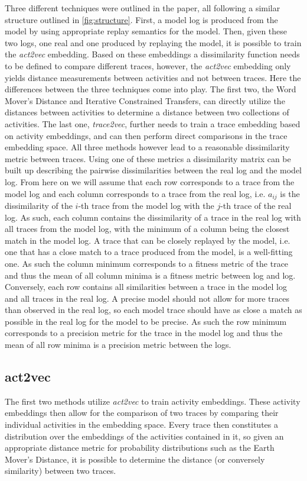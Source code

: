 \documentclass[runningheads]{template/llncs}
\begin{document}
\color{blue}
Three different techniques were outlined in the paper, all following a similar structure outlined in \cref{fig:structure}.
First, a model log is produced from the model by using appropriate replay semantics for the model.
Then, given these two logs, one real and one produced by replaying the model, it is possible to train the \emph{act2vec} \cite{KBWe18} embedding.
Based on these embeddings a dissimilarity function needs to be defined to compare different traces, however, the \emph{act2vec} embedding only yields distance measurements between activities and not between traces.
Here the differences between the three techniques come into play.
The first two, the Word Mover's Distance \cite{KSKW15} and Iterative Constrained Transfers, can directly utilize the distances between activities to determine a distance between two collections of activities.
The last one, \emph{trace2vec}, further needs to train a trace embedding based on activity embeddings, and can then perform direct comparisons in the trace embedding space.
All three methods however lead to a reasonable dissimilarity metric between traces.
Using one of these metrics a dissimilarity matrix can be built up describing the pairwise dissimilarities between the real log and the model log.
\color{black}
From here on we will assume that each row corresponds to a trace from the model log and each column corresponds to a trace from the real log, i.e. $a_{ij}$ is the dissimilarity of the $i$-th trace from the model log with the $j$-th trace of the real log.
As such, each column contains the dissimilarity of a trace in the real log with all traces from the model log, with the minimum of a column being the closest match in the model log.
A trace that can be closely replayed by the model, i.e. one that has a close match to a trace produced from the model, is a well-fitting one.
As such the column minimum corresponds to a fitness metric of the trace and thus the mean of all column minima is a fitness metric between log and log.
Conversely, each row contains all similarities between a trace in the model log and all traces in the real log.
A precise model should not allow for more traces than observed in the real log, so each model trace should have as close a match as possible in the real log for the model to be precise.
As such the row minimum corresponds to a precision metric for the trace in the model log and thus the mean of all row minima is a precision metric between the logs.

\subsection{act2vec}
The first two methods utilize \emph{act2vec} to train activity embeddings.
These activity embeddings then allow for the comparison of two traces by comparing their individual activities in the embedding space.
Every trace then constitutes a distribution over the embeddings of the activities contained in it, so given an appropriate distance metric for probability distributions such as the Earth Mover's Distance, it is possible to determine the distance (or conversely similarity) between two traces.
\end{document}
